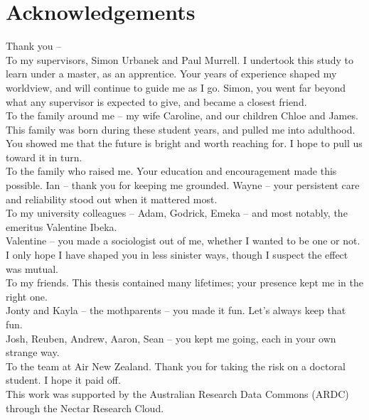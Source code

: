\chapter*{\centering \large Acknowledgements}
\thispagestyle{empty}
Thank you --
\\
To my supervisors, Simon Urbanek and Paul Murrell.
I undertook this study to learn under a master, as an apprentice.
Your years of experience shaped my worldview, and will continue to guide me as I go.
Simon, you went far beyond what any supervisor is expected to give, and became a closest friend.
\\
To the family around me -- my wife Caroline, and our children Chloe and James.
This family was born during these student years, and pulled me into adulthood.
You showed me that the future is bright and worth reaching for.
I hope to pull us toward it in turn.
\\
To the family who raised me.
Your education and encouragement made this possible.
Ian -- thank you for keeping me grounded.
Wayne -- your persistent care and reliability stood out when it mattered most.
\\
To my university colleagues -- Adam, Godrick, Emeka -- and most notably, the emeritus Valentine Ibeka.
\\
Valentine -- you made a sociologist out of me, whether I wanted to be one or not.
I only hope I have shaped you in less sinister ways, though I suspect the effect was mutual.
\\
To my friends. This thesis contained many lifetimes; your presence kept me in the right one.
\\
Jonty and Kayla -- the mothparents -- you made it fun. Let's always keep that fun.
\\
Josh, Reuben, Andrew, Aaron, Sean -- you kept me going, each in your own strange way.
\\
To the team at Air New Zealand. Thank you for taking the risk on a doctoral student. I hope it paid off.
\\
This work was supported by the Australian Research Data Commons (ARDC) through the Nectar Research Cloud\cite{nectar2021}.

\newpage
\
\thispagestyle{empty}
\newpage

\newpage
{}
\tableofcontents
\newpage \ \newpage
\listoffigures
\newpage
\listoftables
\newpage \ \newpage
\listoflistings
{}

